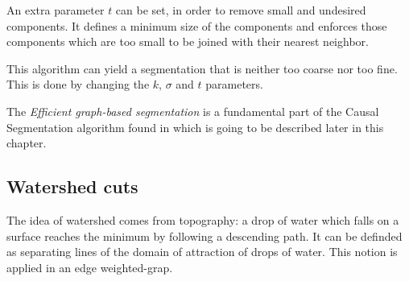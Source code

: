 An extra parameter \(t\) can be set, in order to remove small and undesired components. It defines a minimum size of the components and enforces those components which are too small to be joined with their nearest neighbor.

This algorithm can yield a segmentation that is neither too coarse nor too fine. This is done by changing the \(k\), \(\sigma\) and \(t\) parameters. 

The 	\textit{Efficient graph-based segmentation} is a fundamental part of the Causal Segmentation algorithm found in \textcite{couprie2013causal} which is going to be described later in this chapter.
\subsection{Watershed cuts}
\label{subsec:watershed}
The idea of watershed comes from topography: a drop of water which falls on a surface reaches the minimum by following a descending path. It can be definded as separating lines of the domain of attraction of drops of water. This notion is applied in an edge weighted-grap.

